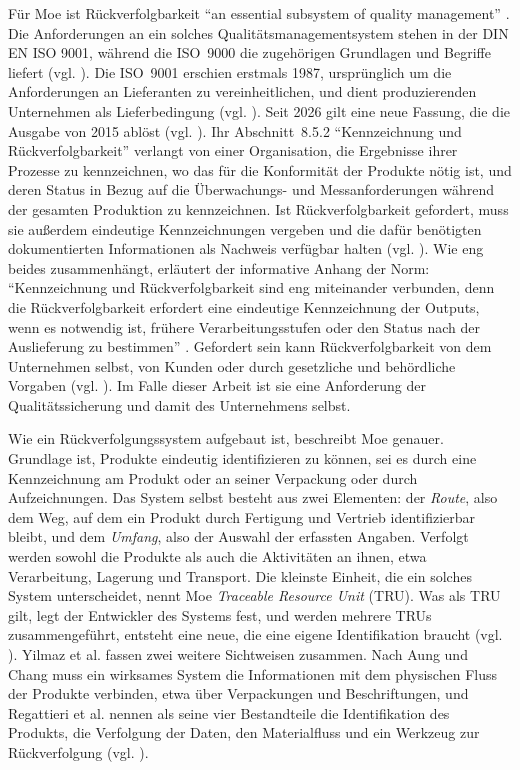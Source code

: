 Für Moe ist Rückverfolgbarkeit \enquote{an essential subsystem of quality
management} \cite[S.~211]{moePerspectivesTraceabilityFood1998}. Die
Anforderungen an ein solches Qualitätsmanagementsystem stehen in der DIN EN ISO
9001, während die ISO~9000 die zugehörigen Grundlagen und Begriffe liefert (vgl.
\cite[S.~9\,f.]{koubekDINISO90012018}). Die ISO~9001 erschien erstmals 1987,
ursprünglich um die Anforderungen an Lieferanten zu vereinheitlichen, und dient
produzierenden Unternehmen als Lieferbedingung (vgl.
\cite[S.~8]{koubekDINISO90012018}). Seit 2026 gilt eine neue Fassung, die die
Ausgabe von 2015 ablöst (vgl. \cite[S.~3]{DINENISO9001_2026}). Ihr
Abschnitt~8.5.2 \enquote{Kennzeichnung und Rückverfolgbarkeit} verlangt von einer
Organisation, die Ergebnisse ihrer Prozesse zu kennzeichnen, wo das für die
Konformität der Produkte nötig ist, und deren Status in Bezug auf die
Überwachungs- und Messanforderungen während der gesamten Produktion zu
kennzeichnen. Ist Rückverfolgbarkeit gefordert, muss sie außerdem eindeutige
Kennzeichnungen vergeben und die dafür benötigten dokumentierten Informationen als
Nachweis verfügbar halten (vgl. \cite[S.~34]{DINENISO9001_2026}). Wie eng beides
zusammenhängt, erläutert der informative Anhang der Norm: \enquote{Kennzeichnung
und Rückverfolgbarkeit sind eng miteinander verbunden, denn die
Rückverfolgbarkeit erfordert eine eindeutige Kennzeichnung der Outputs, wenn es
notwendig ist, frühere Verarbeitungsstufen oder den Status nach der Auslieferung
zu bestimmen} \cite[S.~50]{DINENISO9001_2026}. Gefordert sein kann
Rückverfolgbarkeit von dem Unternehmen selbst, von Kunden oder durch
gesetzliche und behördliche Vorgaben (vgl. \cite[S.~50]{DINENISO9001_2026}). 
Im Falle dieser Arbeit ist sie eine Anforderung der Qualitätssicherung und damit des Unternehmens selbst.

Wie ein Rückverfolgungssystem aufgebaut ist, beschreibt Moe genauer.
Grundlage ist, Produkte eindeutig identifizieren zu können, sei es durch eine
Kennzeichnung am Produkt oder an seiner Verpackung oder durch Aufzeichnungen.
Das System selbst besteht aus zwei Elementen: der \emph{Route}, also dem Weg, auf
dem ein Produkt durch Fertigung und Vertrieb identifizierbar bleibt, und dem
\emph{Umfang}, also der Auswahl der erfassten Angaben. Verfolgt werden sowohl die
Produkte als auch die Aktivitäten an ihnen, etwa Verarbeitung, Lagerung und
Transport. Die kleinste Einheit, die ein solches System unterscheidet, nennt Moe
\emph{Traceable Resource Unit} (TRU). Was als TRU gilt, legt der Entwickler des
Systems fest, und werden mehrere TRUs zusammengeführt, entsteht eine neue, die
eine eigene Identifikation braucht (vgl.
\cite[S.~212]{moePerspectivesTraceabilityFood1998}). Yilmaz et al. fassen zwei
weitere Sichtweisen zusammen. Nach Aung und Chang muss ein wirksames System die
Informationen mit dem physischen Fluss der Produkte verbinden, etwa über
Verpackungen und Beschriftungen, und Regattieri et al. nennen als seine vier
Bestandteile die Identifikation des Produkts, die Verfolgung der Daten, den
Materialfluss und ein Werkzeug zur Rückverfolgung (vgl.
\cite[S.~13]{yilmazTransparenzUndRueckverfolgbarkeit2022}).


